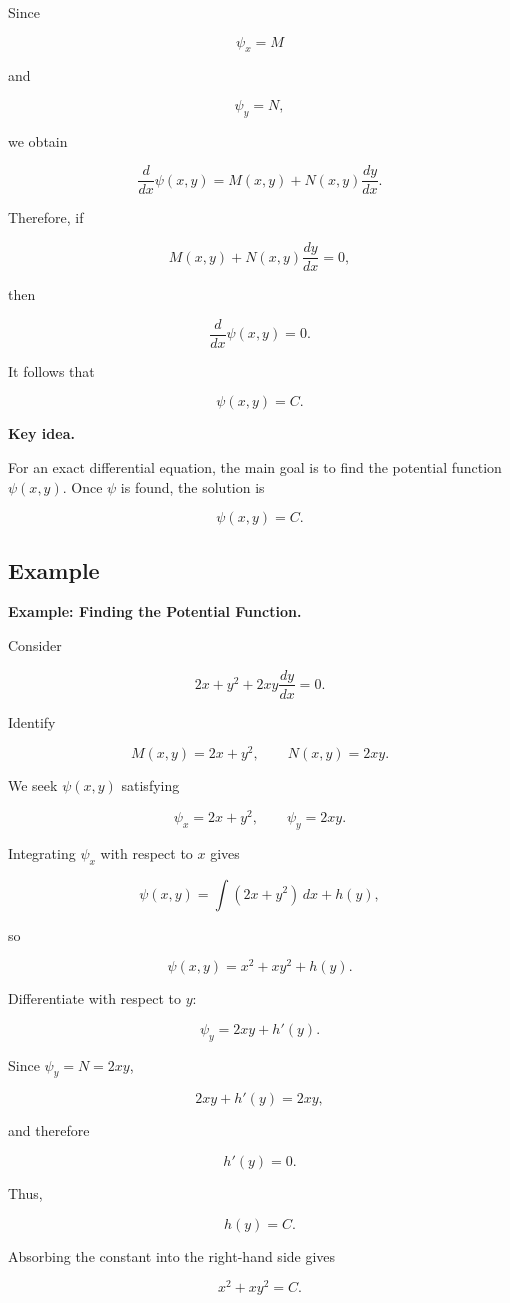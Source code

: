 \documentclass[11pt]{article}
\newenvironment{examplebox}[1]
    {\par\medskip\noindent\textbf{Example: #1.}\par}
    {\par\medskip}
\newenvironment{keyideabox}
    {\par\medskip\noindent\textbf{Key idea.}\par}
    {\par\medskip}
\begin{document}
Since

\[
\psi_x=M
\]

and

\[
\psi_y=N,
\]

we obtain

\[
\frac{d}{dx}\psi(x,y)
=
M(x,y)+N(x,y)\frac{dy}{dx}.
\]

Therefore, if

\[
M(x,y)+N(x,y)\frac{dy}{dx}=0,
\]

then

\[
\frac{d}{dx}\psi(x,y)=0.
\]

It follows that

\[
\boxed{\psi(x,y)=C}.
\]

\begin{keyideabox}

For an exact differential equation, the main goal is to find the
potential function $\psi(x,y)$. Once $\psi$ is found, the solution is

\[
\boxed{\psi(x,y)=C}.
\]

\end{keyideabox}

\subsection{Example}

\begin{examplebox}{Finding the Potential Function}

Consider

\[
2x+y^2+2xy\frac{dy}{dx}=0.
\]

Identify

\[
M(x,y)=2x+y^2,
\qquad
N(x,y)=2xy.
\]

We seek $\psi(x,y)$ satisfying

\[
\psi_x=2x+y^2,
\qquad
\psi_y=2xy.
\]

Integrating $\psi_x$ with respect to $x$ gives

\[
\psi(x,y)
=
\int(2x+y^2)\,dx+h(y),
\]

so

\[
\psi(x,y)
=
x^2+xy^2+h(y).
\]

Differentiate with respect to $y$:

\[
\psi_y
=
2xy+h'(y).
\]

Since $\psi_y=N=2xy$,

\[
2xy+h'(y)=2xy,
\]

and therefore

\[
h'(y)=0.
\]

Thus,

\[
h(y)=C.
\]

Absorbing the constant into the right-hand side gives

\[
\boxed{x^2+xy^2=C}.
\]

\end{examplebox}
\end{document}
